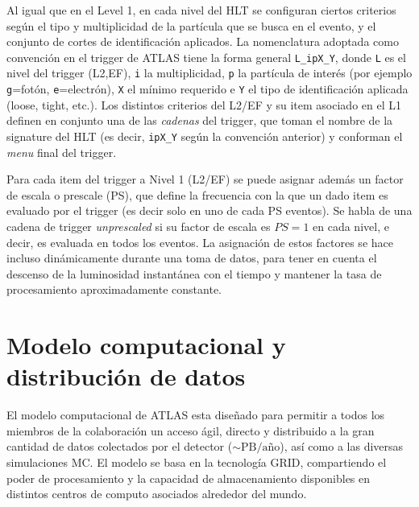 Al igual que en el Level 1, en cada nivel del HLT se configuran ciertos
criterios según el tipo y multiplicidad de la partícula que se busca en el
evento, y el conjunto de cortes de identificación aplicados. La nomenclatura
adoptada como convención en el trigger de ATLAS tiene la forma general
\texttt{L\_ipX\_Y}, donde \texttt{L} es el nivel del trigger (L2,EF), \texttt{i}
la multiplicidad, \texttt{p} la partícula de interés (por ejemplo
\texttt{g}=fotón, \texttt{e}=electrón), \texttt{X} el {\pt} mínimo requerido e
\texttt{Y} el tipo de identificación aplicada (loose, tight, etc.). Los
distintos criterios del L2/EF y su item asociado en el L1 definen en conjunto
una de las \emph{cadenas} del trigger, que toman el nombre de la signature del
HLT (es decir,  \texttt{ipX\_Y} según la convención anterior) y conforman el \emph{menu} final
del trigger.

Para cada item del trigger a Nivel 1 (L2/EF) se puede asignar además
un factor de escala o prescale (PS), que define la frecuencia con la que un dado
item es evaluado por el trigger (es decir solo en uno de cada PS eventos).
Se habla de una cadena de trigger \emph{unprescaled} si su factor de escala es
$PS = 1$ en cada nivel, e decir, es evaluada en todos los eventos. La asignación de estos
factores se hace incluso dinámicamente durante una toma de datos, para tener en
cuenta el descenso de la luminosidad instantánea con el tiempo y mantener la
tasa de procesamiento aproximadamente constante.



\section{Modelo computacional y distribución de datos}

El modelo computacional de ATLAS esta diseñado para permitir a todos los
miembros de la colaboración un acceso ágil, directo y distribuido a la gran
cantidad de datos colectados por el detector ($\sim \text{PB}/\text{a\~no}$),
así como a las diversas simulaciones MC. El modelo se basa en la tecnología
GRID, compartiendo el poder de procesamiento y la capacidad de almacenamiento
disponibles en distintos centros de computo asociados alrededor del mundo.

